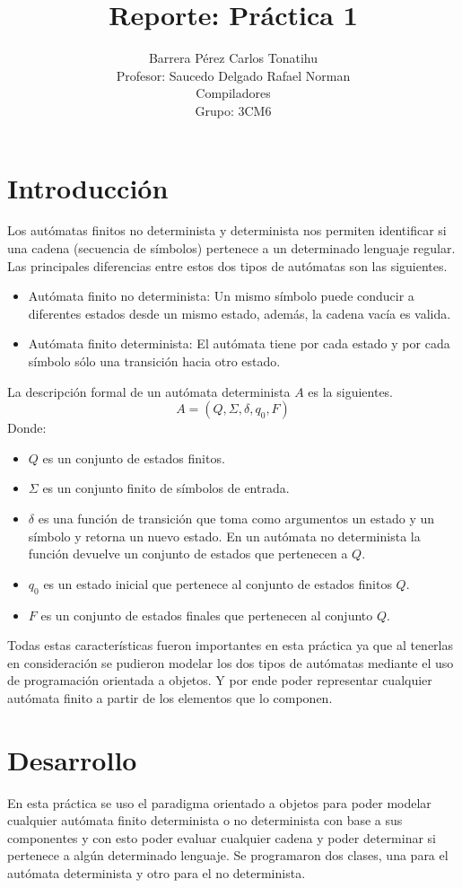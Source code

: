 \documentclass[16pt, titlepage]{article}
\title{Reporte: Práctica 1}
\author{Barrera Pérez Carlos Tonatihu \\ Profesor: Saucedo Delgado Rafael Norman \\ Compiladores \\ Grupo: 3CM6 }
\begin{document}
	\maketitle
	\tableofcontents
	
	\section{Introducción}
	Los autómatas finitos no determinista y determinista nos permiten identificar si una cadena (secuencia de símbolos) 
	pertenece a un determinado lenguaje regular. Las principales diferencias entre estos dos tipos de autómatas son las siguientes.
	
	\begin{itemize}
		\item Autómata finito no determinista: Un mismo símbolo puede conducir a diferentes estados desde un mismo estado, 
		además, la cadena vacía es valida.
		\item Autómata finito determinista: El autómata tiene por cada estado y por cada símbolo sólo una transición hacia otro estado.
	\end{itemize}

	La descripción formal de un autómata determinista $A$ es la siguientes.
	\[ A = (Q, \Sigma , \delta, q_{0}, F) \]
	Donde:
	
	\begin{itemize}
		\item $Q$ es un conjunto de estados finitos.
		\item $\Sigma$ es un conjunto finito de símbolos de entrada.
		\item $\delta$ es una función de transición que toma como argumentos un estado y un símbolo y retorna un nuevo estado. 
		En un autómata no determinista la función devuelve un conjunto de estados que pertenecen a $Q$.
		\item $q_{0}$ es un estado inicial que pertenece al conjunto de estados finitos $Q$.
		\item $F$ es un conjunto de estados finales que pertenecen al conjunto $Q$.
	\end{itemize}

	Todas estas características fueron importantes en esta práctica ya que al tenerlas en consideración se pudieron 
	modelar los dos tipos de autómatas mediante el uso de programación orientada a objetos. 
	Y por ende poder representar cualquier autómata finito a partir de los elementos que lo componen.
	
	\section{Desarrollo}
	En esta práctica se uso el paradigma orientado a objetos para poder modelar cualquier autómata finito determinista 
	o no determinista con base a sus componentes y con esto poder evaluar cualquier cadena y poder determinar 
	si pertenece a algún determinado lenguaje. Se programaron dos clases, una para el autómata determinista y otro para el no determinista.
	
\end{document}
